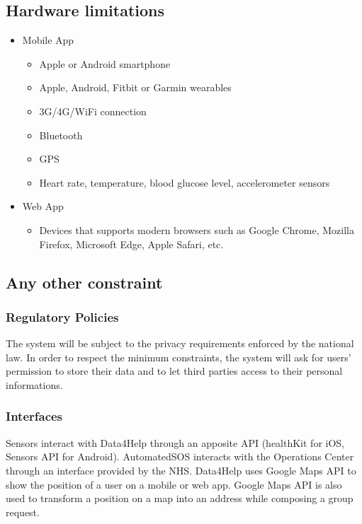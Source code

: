 \subsection{Hardware limitations}
\begin{itemize}
\item Mobile App
    \begin{itemize}
        \item Apple or Android smartphone
        \item Apple, Android, Fitbit or Garmin wearables
        \item 3G/4G/WiFi connection
        \item Bluetooth
        \item GPS
        \item Heart rate, temperature, blood glucose level, accelerometer sensors
    \end{itemize}
\item Web App
    \begin{itemize}
        \item Devices that supports modern browsers such as Google Chrome, Mozilla Firefox, Microsoft Edge, Apple Safari, etc.
    \end{itemize}
\end{itemize}
\subsection{Any other constraint}

\subsubsection{Regulatory Policies}
The system will be subject to the privacy requirements enforced by the national law. In order to respect the minimum constraints, the system will ask for users' permission to store their data and to let third parties access to their personal informations.

\subsubsection{Interfaces}
    Sensors interact with Data4Help through an apposite API (healthKit for iOS\cite{healthKit}, Sensors API for Android\cite{sensorsAPI}).
    AutomatedSOS interacts with the Operations Center through an interface provided by the NHS.
    Data4Help uses Google Maps API to show the position of a user on a mobile or web app.
    Google Maps API is also used to transform a position on a map into an address while composing a group request.


